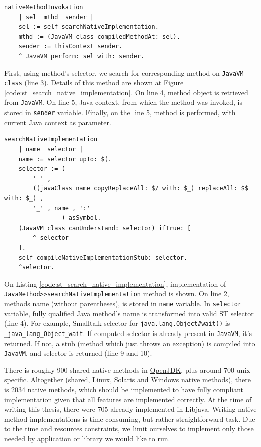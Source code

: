 \documentclass[11pt,twoside,a4paper]{book}
\newcommand{\libjava}{{Libjava}}
\begin{document}
\begin{lstlisting}[caption=nativeMethodInvokation ST method, label=code:st_native_method_invocation]
nativeMethodInvokation
    | sel  mthd  sender |
    sel := self searchNativeImplementation.
    mthd := (JavaVM class compiledMethodAt: sel).
    sender := thisContext sender.
    ^ JavaVM perform: sel with: sender.
\end{lstlisting}

First, using method's selector, we search for corresponding method on \texttt{JavaVM class} (line 3).
Details of this method are shown at Figure \ref{code:st_search_native_implementation}.
On line 4, method object is retrieved from \texttt{JavaVM}.
On line 5, Java context, from which the method was invoked, is stored in \texttt{sender} variable.
Finally, on the line 5, method is performed, with current Java context as parameter.

\begin{lstlisting}[caption=searchNativeImplementation ST method, label=code:st_search_native_implementation]
searchNativeImplementation
    | name  selector |
    name := selector upTo: $(.
    selector := (
        '_' , 
        ((javaClass name copyReplaceAll: $/ with: $_) replaceAll: $$ with: $_) ,
        '_' , name , ':'
                ) asSymbol.
    (JavaVM class canUnderstand: selector) ifTrue: [
        ^ selector
    ].
    self compileNativeImplementationStub: selector.
    ^selector.
\end{lstlisting}

On Listing \ref{code:st_search_native_implementation}, implementation of \texttt{JavaMethod>>searchNativeImplementation} method is shown.
On line 2, methods name (without parentheses), is stored in \texttt{name} variable.
In \texttt{selector} variable, fully qualified Java method's name is transformed into valid ST selector (line 4).
For example, Smalltalk selector for \texttt{java.lang.Object\#wait()} is \texttt{\_java\_lang\_Object\_wait}.
If computed selector is already present in \texttt{JavaVM}, it's returned.
If not, a stub (method which just throws an exception) is compiled into \texttt{JavaVM}, and selector is returned (line 9 and 10).

There is roughly 900 shared native methods in \href{http://openjdk.java.net/}{OpenJDK}, plus around 700 unix specific. 
Altogether (shared, Linux, Solaris and Windows native methods), there is 2034 native methods, which should be implemented to have fully compliant implementation given that all features are implemented correctly.
At the time of writing this thesis, there were 705 already implemented in \libjava{}.
Writing native method implementations is time consuming, but rather straightforward task. 
Due to the time and resources constraints, we limit ourselves to implement only those needed by application or library we  would like to run.
\end{document}
